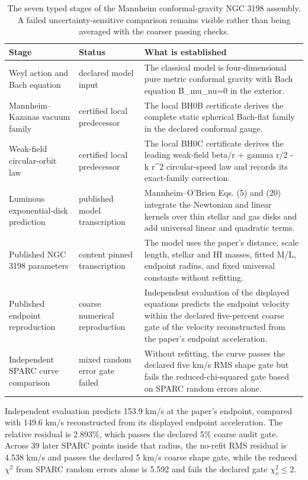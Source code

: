 \begin{table}[htbp]
\centering
\scriptsize
\begin{tabularx}{\textwidth}{@{}p{}p{}Y@{}}
\toprule
Stage & Status & What is established \\
\midrule
Weyl action and Bach equation & declared model input & The classical model is four-dimensional pure metric conformal gravity with Bach equation B\_mu\_nu=0 in the exterior. \\
Mannheim--Kazanas vacuum family & certified local predecessor & The local BH0B certificate derives the complete static spherical Bach-flat family in the declared conformal gauge. \\
Weak-field circular-orbit law & certified local predecessor & The local BH0C certificate derives the leading weak-field beta/r + gamma r/2 - k r\textasciicircum{}2 circular-speed law and records its exact-family correction. \\
Luminous exponential-disk prediction & published model transcription & Mannheim--O'Brien Eqs. (5) and (20) integrate the Newtonian and linear kernels over thin stellar and gas disks and add universal linear and quadratic terms. \\
Published NGC 3198 parameters & content pinned transcription & The model uses the paper's distance, scale length, stellar and HI masses, fitted M/L, endpoint radius, and fixed universal constants without refitting. \\
Published endpoint reproduction & coarse numerical reproduction & Independent evaluation of the displayed equations predicts the endpoint velocity within the declared five-percent coarse gate of the velocity reconstructed from the paper's endpoint acceleration. \\
Independent SPARC curve comparison & mixed random error gate failed & Without refitting, the curve passes the declared five km/s RMS shape gate but fails the reduced-chi-squared gate based on SPARC random errors alone. \\
\bottomrule
\end{tabularx}
\caption{The seven typed stages of the Mannheim conformal-gravity NGC 3198 assembly.  A failed uncertainty-sensitive comparison remains visible rather than being averaged with the coarser passing checks.}
\label{tab:mannheim-ngc3198-assembly}
\end{table}

Independent evaluation predicts 153.9 km/s at the paper's endpoint, compared with 149.6 km/s reconstructed from its displayed endpoint acceleration.  The relative residual is 2.893\%, which passes the declared 5\% coarse audit gate.  Across 39 later SPARC points inside that radius, the no-refit RMS residual is 4.538 km/s and passes the declared 5 km/s coarse shape gate, while the reduced $\chi^2$ from SPARC random errors alone is 5.592 and fails the declared gate $\chi^2_\nu\leq2$.

